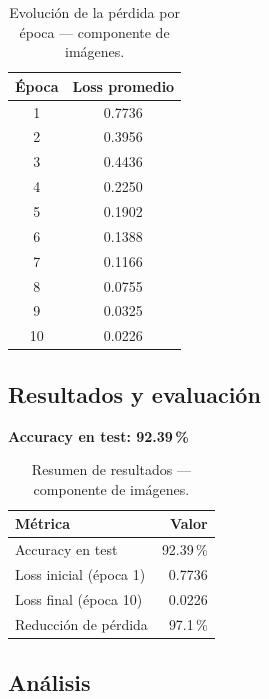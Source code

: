 \documentclass[12pt,a4paper]{article}
\begin{document}
\begin{table}[H]
  \centering
  \begin{tabular}{cc}
    \toprule
    \textbf{Época} & \textbf{Loss promedio} \\
    \midrule
     1 & 0.7736 \\
     2 & 0.3956 \\
     3 & 0.4436 \\
     4 & 0.2250 \\
     5 & 0.1902 \\
     6 & 0.1388 \\
     7 & 0.1166 \\
     8 & 0.0755 \\
     9 & 0.0325 \\
    10 & 0.0226 \\
    \bottomrule
  \end{tabular}
  \caption{Evolución de la pérdida por época — componente de imágenes.}
\end{table}

\subsection{Resultados y evaluación}

\begin{resultbox}
\textbf{Accuracy en test: 92.39\,\%}
\end{resultbox}

\vspace{0.5em}

\begin{table}[H]
  \centering
  \begin{tabular}{lr}
    \toprule
    \textbf{Métrica} & \textbf{Valor} \\
    \midrule
    Accuracy en test       & 92.39\,\% \\
    Loss inicial (época 1) & 0.7736    \\
    Loss final  (época 10) & 0.0226    \\
    Reducción de pérdida   & 97.1\,\%  \\
    \bottomrule
  \end{tabular}
  \caption{Resumen de resultados — componente de imágenes.}
\end{table}

\subsection{Análisis}
\end{document}
